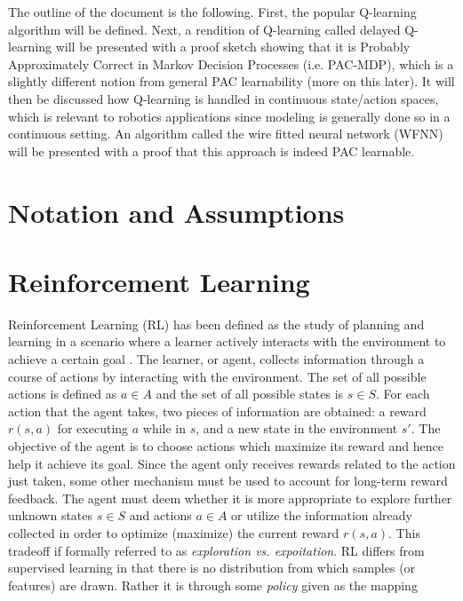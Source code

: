 \documentclass{article} %
\begin{document}
The outline of the document is the following. First, the popular Q-learning algorithm will be  defined. Next, a rendition of Q-learning called delayed Q-learning will be presented with a proof sketch showing that it is Probably Approximately Correct in Markov Decision Processes (i.e. PAC-MDP), which is a slightly different notion from general PAC learnability (more on this later). It will then be discussed how Q-learning is handled in continuous state/action spaces, which is relevant to robotics applications since modeling is generally done so in a continuous setting. An algorithm called the wire fitted neural network (WFNN) will be presented with a proof that this approach is indeed PAC learnable. 

\section{Notation and Assumptions}







\section{Reinforcement Learning}

Reinforcement Learning (RL) has been defined as the study of planning and learning in a scenario where a learner actively interacts with the environment to achieve a certain goal \cite{mohri}. The learner, or agent, collects information through a course of actions by interacting with the environment.  The set of all possible actions is defined as $a \in A$ and the set of all possible states is $s \in S$. For each action that the agent takes, two pieces of information are obtained: a reward $r(s,a)$ for executing $a$ while in $s$, and a new state in the environment $s'$.  The objective of the agent is to choose actions which maximize its reward and hence help it achieve its goal.  Since the agent only receives rewards related to the action just taken, some other mechanism must be used to account for long-term reward feedback.
The agent must deem whether it is more appropriate to explore further unknown states $s \in S$ and actions $a \in A$ or utilize the information already collected in order to optimize (maximize) the current reward $r(s,a)$. This tradeoff if formally referred to as \textit{exploration vs. expoitation}. RL differs from supervised learning in that there is no distribution from which samples (or features) are drawn. Rather it is through some \textit{policy} given as the mapping
\end{document}
